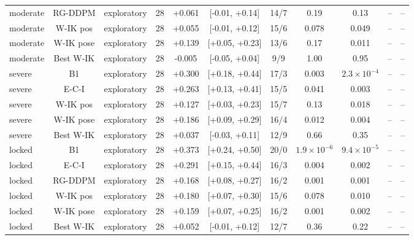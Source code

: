 \begin{table}[t]
\begin{tabular}{lcccccccccc}
moderate & RG-DDPM & exploratory & 28 & +0.061 & [-0.01, +0.14] & 14/7 & 0.19 & 0.13 & -- & -- \\
moderate & W-IK pos & exploratory & 28 & +0.055 & [-0.01, +0.12] & 15/6 & 0.078 & 0.049 & -- & -- \\
moderate & W-IK pose & exploratory & 28 & +0.139 & [+0.05, +0.23] & 13/6 & 0.17 & 0.011 & -- & -- \\
moderate & Best W-IK & exploratory & 28 & -0.005 & [-0.05, +0.04] & 9/9 & 1.00 & 0.95 & -- & -- \\
severe & B1 & exploratory & 28 & +0.300 & [+0.18, +0.44] & 17/3 & 0.003 & $2.3\times10^{-4}$ & -- & -- \\
severe & E-C-I & exploratory & 28 & +0.263 & [+0.13, +0.41] & 15/5 & 0.041 & 0.003 & -- & -- \\
severe & W-IK pos & exploratory & 28 & +0.127 & [+0.03, +0.23] & 15/7 & 0.13 & 0.018 & -- & -- \\
severe & W-IK pose & exploratory & 28 & +0.186 & [+0.09, +0.29] & 16/4 & 0.012 & 0.004 & -- & -- \\
severe & Best W-IK & exploratory & 28 & +0.037 & [-0.03, +0.11] & 12/9 & 0.66 & 0.35 & -- & -- \\
locked & B1 & exploratory & 28 & +0.373 & [+0.24, +0.50] & 20/0 & $1.9\times10^{-6}$ & $9.4\times10^{-5}$ & -- & -- \\
locked & E-C-I & exploratory & 28 & +0.291 & [+0.15, +0.44] & 16/3 & 0.004 & 0.002 & -- & -- \\
locked & RG-DDPM & exploratory & 28 & +0.168 & [+0.08, +0.27] & 16/2 & 0.001 & 0.001 & -- & -- \\
locked & W-IK pos & exploratory & 28 & +0.180 & [+0.07, +0.30] & 15/6 & 0.078 & 0.010 & -- & -- \\
locked & W-IK pose & exploratory & 28 & +0.159 & [+0.07, +0.25] & 16/2 & 0.001 & 0.002 & -- & -- \\
locked & Best W-IK & exploratory & 28 & +0.052 & [-0.01, +0.12] & 12/7 & 0.36 & 0.22 & -- & -- \\
\bottomrule
\end{tabular}
\end{table}
